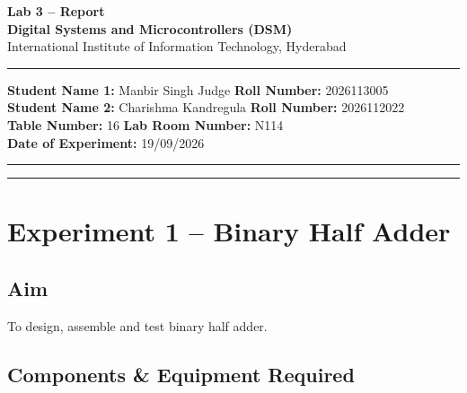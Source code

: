 \documentclass[11pt, a4paper]{article}
\begin{document}
\thispagestyle{no_hdr_border_rule}

\begin{center}
    {\Large \textbf{Lab 3 -- Report}} \\[0.2cm]
    {\large \textbf{Digital Systems and Microcontrollers (DSM)}} \\[0.1cm]
    {\normalsize International Institute of Information Technology, Hyderabad} \\[0.3cm]
\end{center}

\vspace{0.2cm}
\hrule
\vspace{0.4cm}

\noindent \textbf{Student Name 1:} Manbir Singh Judge \hfill \textbf{Roll Number:} 2026113005 \\
\noindent \textbf{Student Name 2:} Charishma Kandregula \hfill \textbf{Roll Number:} 2026112022 \\
\noindent \textbf{Table Number:} 16 \hfill \textbf{Lab Room Number:} N114 \\
\noindent \textbf{Date of Experiment:} 19/09/2026

\vspace{0.4cm}
\hrule
\vspace{0.5cm}

\vspace{1em}

\tableofcontents
\vspace{0.5cm}
\hrule
\vspace{0.8cm}



\newpage

\section{Experiment 1 -- Binary Half Adder}

\subsection{Aim}
To design, assemble and test binary half adder. 

\subsection{Components \& Equipment Required}
\end{document}
